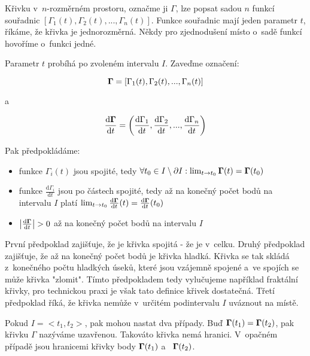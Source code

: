 Křivku v~\(n\)-rozměrném prostoru, označme ji \(\Gamma\), lze popsat sadou \(n\) funkcí souřadnic \([\Gamma_1(t), \Gamma_2(t), ..., \Gamma_n(t)]\). Funkce souřadnic mají jeden parametr \(t\), říkáme, že křivka je jednorozměrná. Někdy pro zjednodušení místo o~sadě funkcí hovoříme o~funkci jedné.

Parametr \(t\) probíhá po zvoleném intervalu \(I\). Zaveďme označení:

\begin{equation}
\boldsymbol{\Gamma} = [\Gamma_1(t), \Gamma_2(t), ..., \Gamma_n(t)]
\end{equation}

a

\begin{equation}
\frac{\mathrm{d}\boldsymbol{\Gamma}}{\mathrm{d}t} = \left(\frac{\mathrm{d}\Gamma_1}{\mathrm{d}t}, \frac{\mathrm{d}\Gamma_2}{\mathrm{d}t}, ..., \frac{\mathrm{d}\Gamma_n}{\mathrm{d}t} \right)
\end{equation}

Pak předpokládáme:

\begin{itemize}
\item funkce \(\Gamma_i(t)\) jsou spojité, tedy \(\forall t_0 \in I \setminus \partial I: \lim_{t \to t_0} \boldsymbol{\Gamma}(t) = \boldsymbol{\Gamma}(t_0)\)
\item funkce \(\frac{\mathrm{d}\Gamma_i}{\mathrm{d}t}\) jsou po částech spojité, tedy až na konečný počet bodů na intervalu \(I\) platí \(\lim_{t \to t_0} \frac{\mathrm{d}\boldsymbol{\Gamma}}{\mathrm{d}t}(t) = \frac{\mathrm{d}\boldsymbol{\Gamma}}{\mathrm{d}t}(t_0)\)
\item \(\left|\frac{\mathrm{d}\boldsymbol{\Gamma}}{\mathrm{d}t} \right| > 0\) až na konečný počet bodů na intervalu \(I\)
\end{itemize}

První předpoklad zajišťuje, že je křivka spojitá - že je v~celku. Druhý předpoklad zajišťuje, že až na konečný počet bodů je křivka hladká. Křivka se tak skládá z~konečného počtu hladkých úseků, které jsou vzájemně spojené a~ve spojích se může křivka "zlomit". Tímto předpokladem tedy vylučujeme například fraktální křivky, pro technickou praxi je však tato definice křivek dostatečná. Třetí předpoklad říká, že křivka nemůže v~určitém podintervalu \(I\) uváznout na místě. 

Pokud \(I = <t_1, t_2>\), pak mohou nastat dva případy. Buď \(\boldsymbol{\Gamma}(t_1) = \boldsymbol{\Gamma}(t_2)\), pak křivku \(\Gamma\) nazýváme uzavřenou. Takováto křivka nemá hranici. V~opačném případě jsou hranicemi křivky body \(\boldsymbol{\Gamma}(t_1)\) a~ \(\boldsymbol{\Gamma}(t_2)\).

